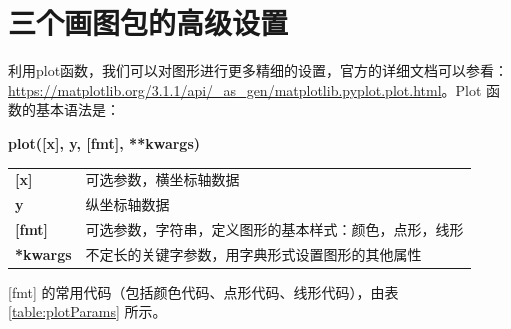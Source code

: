 \section{三个画图包的高级设置}

利用plot函数，我们可以对图形进行更多精细的设置，官方的详细文档可以参看： \href{https://matplotlib.org/3.1.1/api/\_as\_gen/matplotlib.pyplot.plot.html}{https://matplotlib.org/3.1.1/api/\_as\_gen/matplotlib.pyplot.plot.html}。Plot 函数的基本语法是：


\begin{center}
\begin{tcolorbox}[title = plot 函数的语法]
\textbf{plot([x], y, [fmt], **kwargs)}
\tcblower
\vspace{10pt}

\begin{tcboutputlisting}
\begin{tabular}{>{\bfseries}ll}
  [x] &可选参数，横坐标轴数据\\
  y & 纵坐标轴数据\\

[fmt] &可选参数，字符串，定义图形的基本样式：颜色，点形，线形\\
**kwargs &不定长的关键字参数，用字典形式设置图形的其他属性
\end{tabular}
\end{tcboutputlisting}
\tcbuselistingtext

\end{tcolorbox}
\end{center}

[fmt] 的常用代码（包括颜色代码、点形代码、线形代码），由表 \ref{table:plotParams} 所示。

